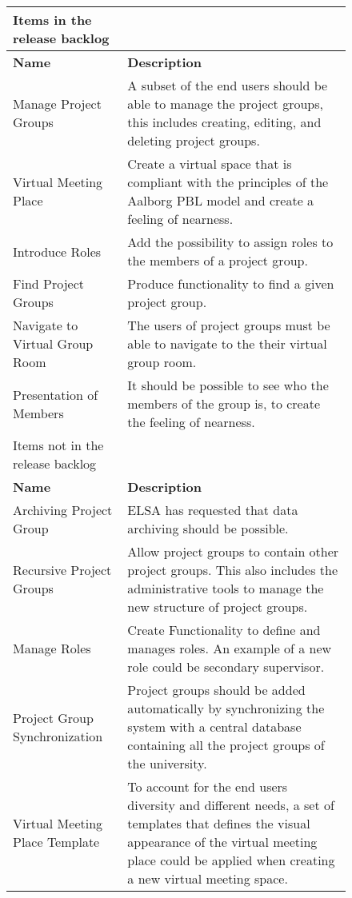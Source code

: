 \begin{figure}%
\begin{tabular}{|p{}|p{}|}
	\hline
	Items in the release backlog \\ %
	\hline
	\textbf{Name} & \textbf{Description} \\
	\hline
	Manage Project Groups & A subset of the end users should be able to manage the project groups, this includes creating, editing, and deleting project groups.  \\
	\hline
	Virtual Meeting Place & Create a virtual space that is compliant with the principles of the Aalborg PBL model and create a feeling of nearness.  \\
	\hline
	Introduce Roles & Add the possibility to assign roles to the members of a project group. \\
	\hline
	Find Project Groups & Produce functionality to find a given project group.\\
	\hline
	Navigate to Virtual Group Room & The users of project groups must be able to navigate to the their virtual group room. \\
	\hline
	Presentation of Members & It should be possible to see who the members of the group is, to create the feeling of nearness. \\
	\hline
	\hline
	Items not in the release backlog \\
	\hline
	\textbf{Name} & \textbf{Description} \\
	\hline
	Archiving Project Group & {ELSA has requested that data archiving should be possible.} \\
	\hline 
	Recursive Project Groups & {Allow project groups to contain other project groups. This also includes the administrative tools to manage the new structure of project groups.} \\
	{Manage Roles} & {Create Functionality to define and manages roles. An example of a new role  could be secondary supervisor.} \\
	\hline
	{Project Group Synchronization} & {Project groups should be added automatically by synchronizing the system with a central database containing all the project groups of the university.}  \\
	\hline 
	Virtual Meeting Place Template & {To account for the end users diversity and different needs, a set of templates that defines the visual appearance of the virtual meeting place could be applied when creating a new virtual meeting space.}  \\
	\hline
\end{tabular}
\label{fig:productbacklog}
\end{figure}

